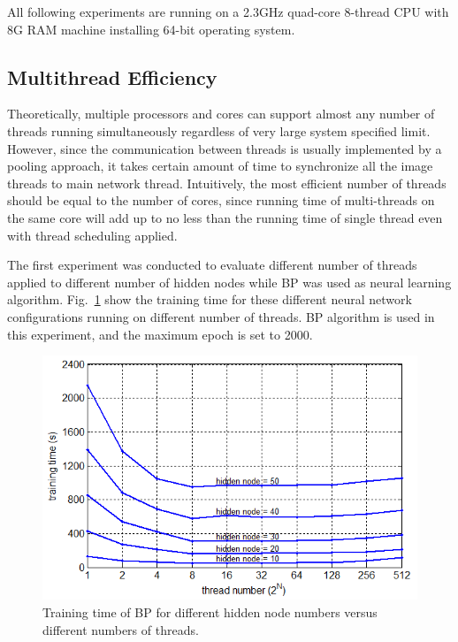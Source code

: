 \documentclass[procedia]{easychair}
\begin{document}
All following experiments are running on a 2.3GHz quad-core 8-thread CPU with 8G RAM machine installing 64-bit operating system.

\subsection{Multithread Efficiency}

Theoretically, multiple processors and cores can support almost any number of threads running simultaneously regardless of very large system specified limit.  However, since the communication between threads is usually implemented by a pooling approach, it takes certain amount of time to synchronize all the image threads to main network thread.  Intuitively, the most efficient number of threads should be equal to the number of cores, since running time of multi-threads on the same core will add up to no less than the running time of single thread even with thread scheduling applied.

The first experiment was conducted to evaluate different number of threads applied to different number of hidden nodes while BP was used as neural learning algorithm.  Fig.~\ref{fig:thread_efficiency} show the training time for these different neural network configurations running on different number of threads.  BP algorithm is used in this experiment, and the maximum epoch is set to 2000.

\begin{figure}[tb]
    \centering
    \includegraphics[scale=0.6]{../../pic/efficiency.png}
    \caption{Training time of BP for different hidden node numbers versus different numbers of threads.}
    \label{fig:thread_efficiency}
\end{figure}
\end{document}
